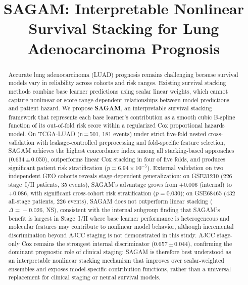\documentclass[conference]{IEEEtran}
\begin{document}
\title{SAGAM: Interpretable Nonlinear Survival Stacking for Lung
Adenocarcinoma Prognosis}

\author{
}

\maketitle

\begin{abstract}
Accurate lung adenocarcinoma (LUAD) prognosis remains challenging because
survival models vary in reliability across cohorts and risk ranges.
Existing survival stacking methods combine base learner predictions using
scalar linear weights, which cannot capture nonlinear or score-range-dependent
relationships between model predictions and patient hazard.
We propose \textbf{SAGAM}, an interpretable survival stacking framework
that represents each base learner's contribution as a smooth cubic B-spline
function of its out-of-fold risk score within a regularized Cox proportional
hazards model.
On TCGA-LUAD (n\,=\,501, 181 events) under strict five-fold nested
cross-validation with leakage-controlled preprocessing and fold-specific
feature selection, SAGAM achieves the highest concordance index among all
stacking-based approaches (0.634\,$\pm$\,0.050), outperforms linear Cox
stacking in four of five folds, and produces significant patient risk
stratification ($p = 6.94 \times 10^{-5}$).
External validation on two independent GEO cohorts reveals stage-dependent
generalization: on GSE31210 (226 stage~I/II patients, 35 events), SAGAM's
advantage grows from $+0.006$ (internal) to $\mathbf{+0.086}$, with
significant cross-cohort risk stratification ($p = 0.030$); on
GSE68465 (432 all-stage patients, 226 events), SAGAM does not outperform
linear stacking ($\Delta\!=\!-0.026$, NS), consistent with the internal
subgroup finding that SAGAM's benefit is largest in Stage~I/II where base
learner performance is heterogeneous and molecular features may contribute
to nonlinear model behavior, although incremental discrimination beyond
AJCC staging is not demonstrated in this study.
AJCC stage-only Cox remains the strongest internal discriminator
(0.657\,$\pm$\,0.044), confirming the dominant prognostic role of clinical
staging; SAGAM is therefore best understood as an interpretable nonlinear
stacking mechanism that improves over scalar-weighted ensembles and exposes
model-specific contribution functions, rather than a universal replacement
for clinical staging or neural survival models.
\end{abstract}
\end{document}
